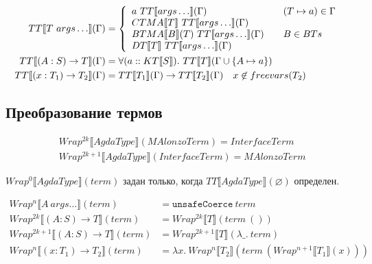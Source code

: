 \begin{align*}
TT\llbracket T\ args\ldots \rrbracket(\Gamma) &= \left\{
   \begin{array}{l l}
      a\ TT\llbracket args\ldots \rrbracket(\Gamma) &\quad (T \mapsto a) \in \Gamma \\
      CTMA\llbracket T \rrbracket\ TT\llbracket args\ldots \rrbracket(\Gamma)\\
      BTMA\llbracket B \rrbracket(T)\ TT\llbracket args\ldots \rrbracket(\Gamma)
         &\quad B \in BTs\\
      DT\llbracket T \rrbracket\ TT\llbracket args\ldots \rrbracket(\Gamma)\\
   \end{array}\right.\\
TT\llbracket (A : S) \rightarrow T \rrbracket(\Gamma) &=
   \forall (a :: KT\llbracket S \rrbracket).\ TT\llbracket T \rrbracket
   (\Gamma \cup \{A \mapsto a\})\\
TT\llbracket (x : T_1) \rightarrow T_2 \rrbracket(\Gamma) &=
   TT\llbracket T_1 \rrbracket(\Gamma) \rightarrow TT\llbracket T_2 \rrbracket(\Gamma)
   \quad x \not\in freevars(T_2)
\end{align*}

\subsection{Преобразование термов}

\begin{align*}
&Wrap^{2k}\llbracket AgdaType \rrbracket(MAlonzoTerm) = InterfaceTerm\\
&Wrap^{2k+1}\llbracket AgdaType \rrbracket(InterfaceTerm) = MAlonzoTerm
\end{align*}

\(Wrap^0\llbracket AgdaType \rrbracket(term)\) задан только, когда
\(TT\llbracket AgdaType \rrbracket(\varnothing)\) определен.

\begin{align*}
Wrap^n\llbracket A\ args\ldots \rrbracket(term) &= \texttt{unsafeCoerce}\ term\\
Wrap^{2k}\llbracket (A : S) \rightarrow T \rrbracket(term) &=
   Wrap^{2k}\llbracket T \rrbracket(term\ ())\\
Wrap^{2k+1}\llbracket (A : S) \rightarrow T \rrbracket(term) &=
   Wrap^{2k+1}\llbracket T \rrbracket(\lambda \_.\ term)\\
Wrap^n\llbracket (x : T_1) \rightarrow T_2 \rrbracket(term) &=
   \lambda x.\ Wrap^n\llbracket T_2 \rrbracket(term\ (
   Wrap^{n+1}\llbracket T_1 \rrbracket(x)))
\end{align*}

